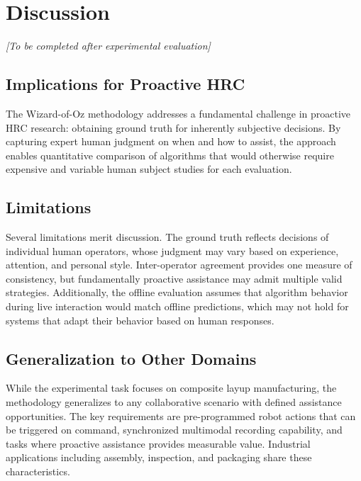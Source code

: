 \documentclass[11pt, a4paper]{article}
\begin{document}
\section{Discussion}

\textit{[To be completed after experimental evaluation]}

\subsection{Implications for Proactive HRC}

The Wizard-of-Oz methodology addresses a fundamental challenge in proactive HRC research: obtaining ground truth for inherently subjective decisions. By capturing expert human judgment on when and how to assist, the approach enables quantitative comparison of algorithms that would otherwise require expensive and variable human subject studies for each evaluation.

\subsection{Limitations}

Several limitations merit discussion. The ground truth reflects decisions of individual human operators, whose judgment may vary based on experience, attention, and personal style. Inter-operator agreement provides one measure of consistency, but fundamentally proactive assistance may admit multiple valid strategies. Additionally, the offline evaluation assumes that algorithm behavior during live interaction would match offline predictions, which may not hold for systems that adapt their behavior based on human responses.

\subsection{Generalization to Other Domains}

While the experimental task focuses on composite layup manufacturing, the methodology generalizes to any collaborative scenario with defined assistance opportunities. The key requirements are pre-programmed robot actions that can be triggered on command, synchronized multimodal recording capability, and tasks where proactive assistance provides measurable value. Industrial applications including assembly, inspection, and packaging share these characteristics.

\end{document}

